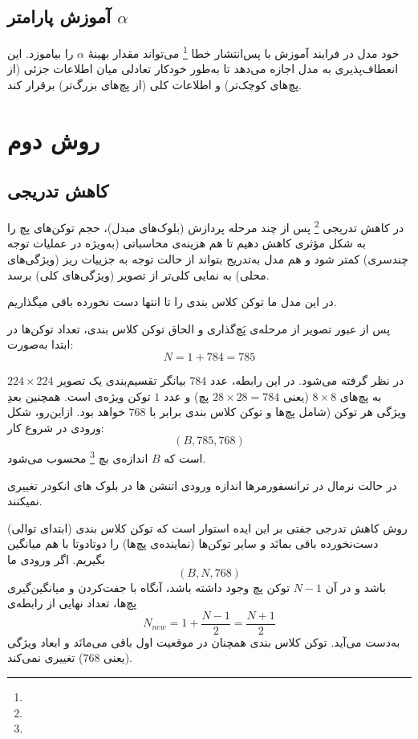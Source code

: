 \subsection*{آموزش پارامتر \(\alpha\)}
خود مدل در فرایند آموزش با پس‌انتشار خطا \footnote{} می‌تواند مقدار بهینهٔ \(\alpha\) را بیاموزد. این انعطاف‌پذیری به مدل اجازه می‌دهد تا به‌طور خودکار تعادلی میان اطلاعات جزئی (از پچ‌های کوچک‌تر) و اطلاعات کلی (از پچ‌های بزرگ‌تر) برقرار کند.



\section{روش دوم}

\subsection{کاهش تدریجی}


در کاهش تدریجی \footnote{}  پس از چند مرحله پردازش (بلوک‌های مبدل)، حجم توکن‌های پچ را به شکل مؤثری کاهش دهیم تا هم هزینه‌ی محاسباتی (به‌ویژه در عملیات توجه چندسری) کمتر شود و هم مدل به‌تدریج بتواند از حالت توجه به جزییات ریز (ویژگی‌های محلی) به نمایی کلی‌تر از تصویر (ویژگی‌های کلی) برسد.

در این مدل ما توکن کلاس بندی را تا انتها دست نخورده باقی میگذاریم.

پس از عبور تصویر از مرحله‌ی پَچ‌گذاری و الحاق توکن کلاس بندی، تعداد توکن‌ها در ابتدا به‌صورت:
\[
N = 1 + 784 = 785
\]


در نظر گرفته می‌شود. در این رابطه، عدد $784$ بیانگر تقسیم‌بندی یک تصویر $224 \times 224$ به پچ‌های $8 \times 8$ (یعنی $28 \times 28 = 784$ پچ) و عدد $1$ توکن ویژه‌ی  است. همچنین بعدِ ویژگی هر توکن (شامل پچ‌ها و  توکن کلاس بندی برابر با $768$ خواهد بود. ازاین‌رو، شکل ورودی در شروع کار:
\[
	(B, 785, 768)
\]
است که \(B\) اندازه‌ی بچ \footnote{} محسوب می‌شود.


در حالت نرمال در ترانسفورمرها اندازه ورودی اتنشن ها در بلوک های انکودر تغییری نمیکنند.


روش کاهش تدرجی جفتی بر این ایده استوار است که توکن کلاس بندی (ابتدای توالی) دست‌نخورده باقی بمانَد و سایر توکن‌ها (نماینده‌ی پچ‌ها) را دوتادوتا با هم میانگین بگیریم. اگر ورودی ما 
\[
	(B, N, 768)
\]
باشد و در آن $N - 1$ توکن پچ وجود داشته باشد، آنگاه با جفت‌کردن و میانگین‌گیری پچ‌ها، تعداد نهایی از رابطه‌ی
\begin{equation}
	N_{new} = 1 + \frac{N - 1}{2} = \frac{N + 1}{2}
\end{equation}
به‌دست می‌آید. توکن کلاس بندی همچنان در موقعیت اول باقی می‌مانَد و ابعاد ویژگی (یعنی $768$) تغییری نمی‌کند.

